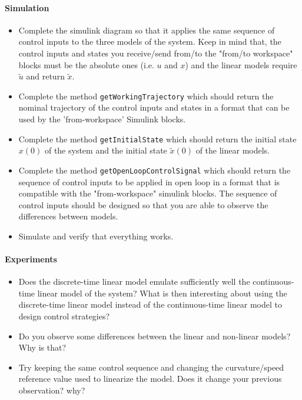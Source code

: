 \paragraph{Simulation}
	\begin{itemize}
		\setlength\itemsep{0em}
		\item Complete the simulink diagram so that it applies the same sequence of control inputs to the three models of the system. 
		Keep in mind that, the control inputs and states you receive/send from/to the "from/to workspace" blocks must be the absolute ones (i.e. $u$ and $x$) and the linear models require $\tilde{u}$ and return $\tilde{x}$.
		\item Complete the method \texttt{getWorkingTrajectory} which should return the nominal trajectory of the control inputs and states in a format that can be used by the 'from-workspace' Simulink blocks. 
		\item Complete the method \texttt{getInitialState} which should return the initial state $x(0)$ of the system and the initial state $\tilde{x}(0)$ of the linear models.
		\item Complete the method \texttt{getOpenLoopControlSignal} which should return the sequence of control inputs to be applied in open loop in a format that is compatible with the "from-workspace" simulink blocks.
		The sequence of control inputs should be designed so that you are able to observe the differences between models.
		\item Simulate and verify that everything works. 
	\end{itemize}	
\paragraph{Experiments}	
	\begin{itemize}
		\setlength\itemsep{0em}
		\item Does the discrete-time linear model emulate sufficiently well the continuous-time linear model of the system?
		What is then interesting about using the discrete-time linear model instead of the continuous-time linear model to design control strategies?  
		\item Do you observe some differences between the linear and non-linear models? Why is that? 
		\item Try keeping the same control sequence and changing the curvature/speed reference value used to linearize the model. 
		Does it change your previous observation? why?
	\end{itemize}

